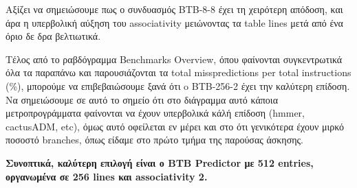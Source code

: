    Αξίζει να σημειώσουμε πως ο συνδυασμός BTB-8-8 έχει τη χειρότερη απόδοση, και
   άρα η υπερβολική αύξηση του associativity μειώνοντας τα table lines μετά από
   ένα όριο δε δρα βελτιωτικά.
  
   Τέλος από το ραβδόγραμμα Benchmarks Overview, όπου φαίνονται συγκεντρωτικά
   όλα τα παραπάνω και παρουσιάζονται τα total misspredictions per total
   instructions (\%), μπορούμε να επιβεβαιώσουμε ξανά ότι o BTB-256-2 έχει την
   καλύτερη επίδοση. Να σημειώσουμε σε αυτό το σημείο ότι στο διάγραμμα αυτό
   κάποια μετροπρογράμματα φαίνονται να έχουν υπερβολικά κάλή επίδοση (hmmer,
   cactusADM, etc), όμως αυτό οφείλεται εν μέρει και στο ότι γενικότερα έχουν
   μιρκό ποσοστό branches, όπως είδαμε στο πρώτο τμήμα της παρούσας άσκησης.
   
   \textbf{Συνοπτικά, καλύτερη επιλογή είναι ο BTB Predictor με 512 entries, οργανωμένα σε 256 lines και associativity 2. }

